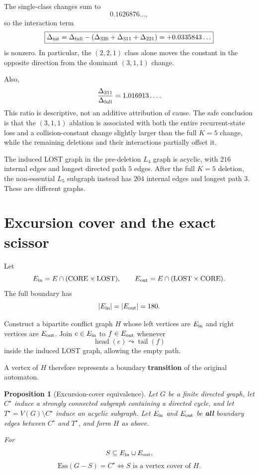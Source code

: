 \documentclass[12pt]{article}
\newtheorem{proposition}[theorem]{Proposition}
\theoremstyle{definition}
\begin{document}
The single-class changes sum to
\[
0.1626876\ldots,
\]
so the interaction term
\[
\boxed{
\Delta_{\rm int}
=
\Delta_{\rm full}
-
(\Delta_{320}+\Delta_{311}+\Delta_{221})
=
+0.0335843\ldots
}
\]
is nonzero. In particular, the \((2,2,1)\) class alone moves the constant in the opposite direction from the dominant \((3,1,1)\) change.

Also,
\[
\frac{\Delta_{311}}{\Delta_{\rm full}}
=
1.016913\ldots.
\]
This ratio is descriptive, not an additive attribution of cause. The safe conclusion is that the \((3,1,1)\) ablation is associated with both the entire recurrent-state loss and a collision-constant change slightly larger than the full \(K=5\) change, while the remaining deletions and their interactions partially offset it.

The induced LOST graph in the pre-deletion \(L_4\) graph is acyclic, with \(216\) internal edges and longest directed path \(5\) edges. After the full \(K=5\) deletion, the non-essential \(L_5\) subgraph instead has \(204\) internal edges and longest path \(3\). These are different graphs.

\section{Excursion cover and the exact scissor}
\label{sec:scissor}

Let
\[
E_{\rm in}
=
E\cap(\mathrm{CORE}\times\mathrm{LOST}),
\qquad
E_{\rm out}
=
E\cap(\mathrm{LOST}\times\mathrm{CORE}).
\]
The full boundary has
\[
|E_{\rm in}|=|E_{\rm out}|=180.
\]

Construct a bipartite conflict graph \(H\) whose left vertices are \(E_{\rm in}\) and right vertices are \(E_{\rm out}\). Join \(e\in E_{\rm in}\) to \(f\in E_{\rm out}\) whenever
\[
\operatorname{head}(e)
\leadsto
\operatorname{tail}(f)
\]
inside the induced LOST graph, allowing the empty path.

A vertex of \(H\) therefore represents a boundary \textbf{transition} of the original automaton.

\begin{proposition}[Excursion-cover equivalence]
\label{prop:excursion}
Let \(G\) be a finite directed graph, let \(C^\star\) induce a strongly connected subgraph containing a directed cycle, and let \(T^\star=V(G)\setminus C^\star\) induce an acyclic subgraph. Let \(E_{\rm in}\) and \(E_{\rm out}\) be \textbf{all} boundary edges between \(C^\star\) and \(T^\star\), and form \(H\) as above.

For
\[
S\subseteq E_{\rm in}\cup E_{\rm out},
\]
\[
\boxed{
\mathrm{Ess}(G-S)=C^\star
\iff
S\text{ is a vertex cover of }H.
}
\]
\end{proposition}
\end{document}
